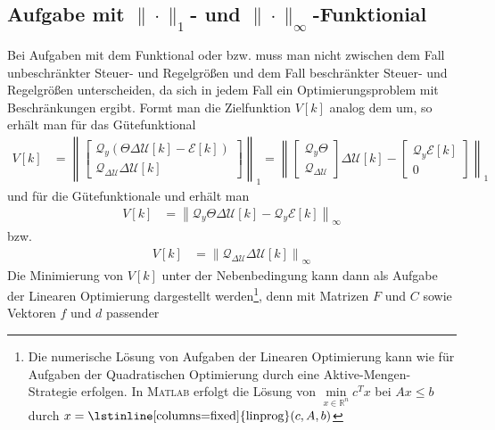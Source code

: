 \subsection{Aufgabe mit $\|\cdot\|_1$- und $\|\cdot\|_{\infty}$-Funktionial}
Bei Aufgaben mit dem Funktional  oder  bzw.  muss
man nicht zwischen dem Fall unbeschränkter Steuer- und Regelgrößen und dem Fall beschränkter Steuer- und Regelgrößen unterscheiden, da sich in jedem Fall ein Optimierungsproblem mit
Beschränkungen ergibt. Formt man die Zielfunktion $V[k]$ analog dem  um, so erhält man für das Gütefunktional
\begin{align}
V[k] & = \left\| \begin{bmatrix}
\mathcal{Q}_y\left( \Theta\Delta\mathcal{U}[k]-\mathcal{E}[k] \right)\\ \mathcal{Q}_{\Delta\mathcal{U}}\Delta\mathcal{U}[k]
\end{bmatrix} \right\|_1 = \left\| \begin{bmatrix}
\mathcal{Q}_y\Theta\\ \mathcal{Q}_{\Delta\mathcal{U}}
\end{bmatrix}\Delta\mathcal{U}[k]-\begin{bmatrix}
\mathcal{Q}_y\mathcal{E}[k]\\ 0
\end{bmatrix} \right\|_1
\end{align}
und für die Gütefunktionale  und  erhält man
\begin{align}
	V[k] & = \left\| \mathcal{Q}_y\Theta\Delta\mathcal{U}[k]-\mathcal{Q}_y\mathcal{E}[k] \right\|_{\infty}
\end{align}
bzw.
\begin{align}
	V[k] & = \left\| \mathcal{Q}_{\Delta\mathcal{U}}\Delta\mathcal{U}[k] \right\|_{\infty}
\end{align}
Die Minimierung von $V[k]$ unter der Nebenbedingung  kann dann als Aufgabe der Linearen Optimierung dargestellt werden\footnote{Die numerische
Lösung von Aufgaben der Linearen Optimierung kann wie für Aufgaben der Quadratischen Optimierung durch eine Aktive-Mengen-Strategie erfolgen. In \textsc{Matlab} erfolgt die Lösung
von $\min\limits_{x\in\mathbb{R}^n}c^Tx$ bei $Ax\le b$ durch $x=\text{\lstinline[columns=fixed]{linprog}}(c,A,b)$}, denn mit Matrizen $F$ und $C$ sowie Vektoren $f$ und $d$ passender
